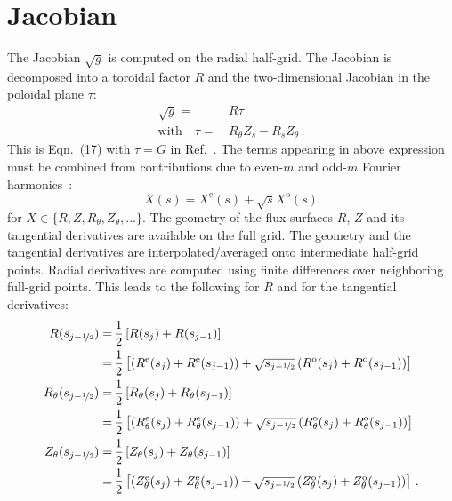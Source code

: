 \FloatBarrier
\section{Jacobian} \label{sec:jacobian}
The Jacobian $\sqrt{g}$ is computed on the radial half-grid.
The Jacobian is decomposed into a toroidal factor $R$
and the two-dimensional Jacobian in the poloidal plane $\tau$:
\begin{align}
                  \sqrt{g} =&\, R \tau \\
  \textrm{with} \quad \tau =&\, R_\theta Z_s - R_s Z_\theta \, .
\end{align}
This is Eqn.~(17) with $\tau = G$ in Ref.~\cite{hirshman_whitson_1983}.
The terms appearing in above expression must be combined from contributions due to even-$m$ and odd-$m$ Fourier harmonics~\cite{hirshman_schwenn_nuehrenberg_1990}:
\begin{equation}
  X(s) = X^\mathrm{e}(s) + \sqrt{s} X^\mathrm{o}(s) \label{eqn:even_odd_comb}
\end{equation}
for $X \in \{ R, Z, R_\theta, Z_\theta, ... \}$.
The geometry of the flux surfaces $R$, $Z$ and its tangential derivatives are available on the full grid.
The geometry and the tangential derivatives are interpolated/averaged onto intermediate half-grid points.
Radial derivatives are computed using finite differences over neighboring full-grid points.
This leads to the following for $R$ and for the tangential derivatives:
\begin{align}
  R(s_{j-\nicefrac{1}{2}})        =&\, \frac{1}{2} \left[ R(s_j) + R(s_{j-1}) \right] \\
                        =&\, \frac{1}{2} \left[                      \left( R^\mathrm{e}(s_j) + R^\mathrm{e}(s_{j-1}) \right)
                                                + \sqrt{s_{j-\nicefrac{1}{2}}} \left( R^\mathrm{o}(s_j) + R^\mathrm{o}(s_{j-1}) \right) \right] \label{eqn:r_half} \\
  R_\theta(s_{j-\nicefrac{1}{2}}) =&\, \frac{1}{2} \left[ R_\theta(s_j) + R_\theta(s_{j-1}) \right] \\
                        =&\, \frac{1}{2} \left[                      \left( R_\theta^\mathrm{e}(s_j) + R_\theta^\mathrm{e}(s_{j-1}) \right)
                                                + \sqrt{s_{j-\nicefrac{1}{2}}} \left( R_\theta^\mathrm{o}(s_j) + R_\theta^\mathrm{o}(s_{j-1}) \right) \right] \\
  Z_\theta(s_{j-\nicefrac{1}{2}}) =&\, \frac{1}{2} \left[ Z_\theta(s_j) + Z_\theta(s_{j-1}) \right] \\
                        =&\, \frac{1}{2} \left[                      \left( Z_\theta^\mathrm{e}(s_j) + Z_\theta^\mathrm{e}(s_{j-1}) \right)
                                                + \sqrt{s_{j-\nicefrac{1}{2}}} \left( Z_\theta^\mathrm{o}(s_j) + Z_\theta^\mathrm{o}(s_{j-1}) \right) \right] \, .
\end{align}
